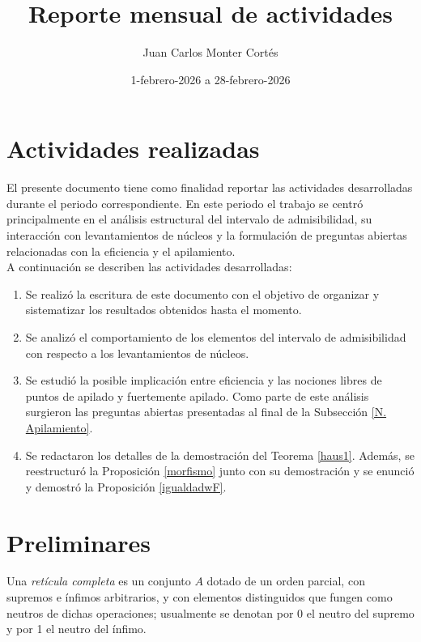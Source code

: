\documentclass[12pt]{article}
\title{Reporte mensual de actividades}
\date{1-febrero-2026 a 28-febrero-2026}
\author{Juan Carlos Monter Cortés}
\begin{document}
\maketitle

\section*{Actividades realizadas}

El presente documento tiene como finalidad reportar las actividades desarrolladas durante el periodo correspondiente. 
En este periodo el trabajo se centró principalmente en el análisis estructural del intervalo de admisibilidad, su interacción 
con levantamientos de núcleos y la formulación de preguntas abiertas relacionadas con la eficiencia y el apilamiento.\\

A continuación se describen las actividades desarrolladas:

\begin{enumerate}
  \item Se realizó la escritura de este documento con el objetivo de organizar y sistematizar los resultados obtenidos hasta el momento.
  
  \item Se analizó el comportamiento de los elementos del intervalo de admisibilidad con respecto a los levantamientos de núcleos.
  
  \item Se estudió la posible implicación entre eficiencia y las nociones libres de puntos de apilado y fuertemente apilado. 
  Como parte de este análisis surgieron las preguntas abiertas presentadas al final de la Subsección \ref{N. Apilamiento}.

  \item Se redactaron los detalles de la demostración del Teorema \ref{haus1}. Además, se reestructuró la Proposición \ref{morfismo} junto con su demostración y se enunció y demostró la Proposición \ref{igualdadwF}.
\end{enumerate}

\section{Preliminares}
Una \emph{retícula completa} es un conjunto $A$ dotado de un orden parcial, con supremos e ínfimos arbitrarios,
y con elementos distinguidos que fungen como neutros de dichas operaciones; usualmente se denotan por 0
el neutro del supremo y por 1 el neutro del ínfimo.
\end{document}
